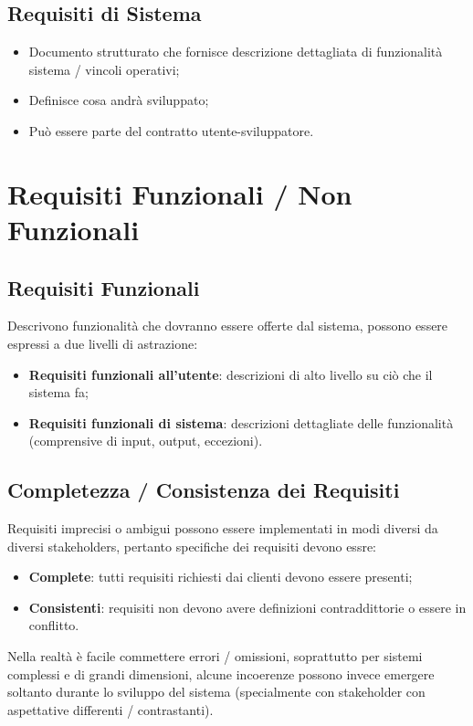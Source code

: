 \documentclass{article}
\begin{document}
    \subsection{Requisiti di Sistema}
      \begin{itemize}
        \item Documento strutturato che fornisce descrizione dettagliata di funzionalità sistema / vincoli operativi;
        \item Definisce cosa andrà sviluppato;
        \item Può essere parte del contratto utente-sviluppatore. 
      \end{itemize}
  \section{Requisiti Funzionali / Non Funzionali}
    \subsection{Requisiti Funzionali}
      Descrivono funzionalità che dovranno essere offerte dal sistema, possono essere espressi a due livelli di astrazione:
      \begin{itemize}
        \item \textbf{Requisiti funzionali all'utente}: descrizioni di alto livello su ciò che il sistema fa;
        \item \textbf{Requisiti funzionali di sistema}: descrizioni dettagliate delle funzionalità (comprensive di input, output, eccezioni). 
      \end{itemize}
    \subsection{Completezza / Consistenza dei Requisiti}
      Requisiti imprecisi o ambigui possono essere implementati in modi diversi da diversi stakeholders, pertanto specifiche dei requisiti devono essre:
      \begin{itemize}
        \item \textbf{Complete}: tutti requisiti richiesti dai clienti devono essere presenti;
        \item \textbf{Consistenti}: requisiti non devono avere definizioni contraddittorie o essere in conflitto. 
      \end{itemize}
      Nella realtà è facile commettere errori / omissioni, soprattutto per sistemi complessi e di grandi dimensioni, alcune incoerenze possono invece emergere soltanto durante lo sviluppo del sistema (specialmente con stakeholder con aspettative differenti / contrastanti). 
\end{document}
